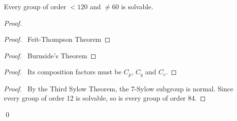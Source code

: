 \begin{prop}
Every group of order $< 120$ and $\neq 60$ is solvable.
\end{prop}

\begin{proof}
\pf
{}
\begin{proof}
	\pf\ Feit-Thompson Theorem
\end{proof}
\begin{proof}
	\pf\ Burnside's Theorem
\end{proof}
\begin{proof}
	\pf\ Its composition factors must be $C_p$, $C_q$ and $C_r$.
\end{proof}
\begin{proof}
	\pf\ By the Third Sylow Theorem, the 7-Sylow subgroup is normal. Since every group of order 12 is solvable, so is every group of order 84.
\end{proof}
\qed
\end{proof}